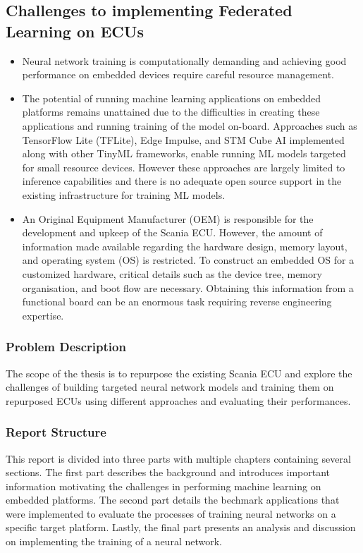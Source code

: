\subsection*{Challenges to implementing Federated Learning on ECUs}

\begin{itemize}
	\item Neural network training is computationally demanding and achieving good performance on embedded devices require careful resource management.
	\item The potential of running machine learning applications on embedded platforms remains unattained due to the difficulties in creating these applications and running training of the model on-board. Approaches such as TensorFlow Lite (TFLite), Edge Impulse, and STM Cube AI implemented along with other TinyML frameworks, enable running ML models targeted for small resource devices. However these approaches are largely limited to inference capabilities and there is no adequate open source support in the existing infrastructure for training ML models.
	\item An Original Equipment Manufacturer (OEM) is responsible for the development and upkeep of the Scania ECU. However, the amount of information made available regarding the hardware design, memory layout, and operating system (OS) is restricted. To construct an embedded OS for a customized hardware, critical details such as the device tree, memory organisation, and boot flow are necessary. Obtaining this information from a functional board can be an enormous task requiring reverse engineering expertise.
\end{itemize}

\subsubsection{Problem Description}

The scope of the thesis is to repurpose the existing Scania ECU and explore the challenges of building targeted neural network models and training them on repurposed ECUs using different approaches and evaluating their performances.

\subsubsection{Report Structure}

This report is divided into three parts with multiple chapters containing several sections. The first part describes the background and introduces important information motivating the challenges in performing machine learning on embedded platforms. The second part details the bechmark applications that were implemented to evaluate the processes of training neural networks on a specific target platform. Lastly, the final part presents an analysis and discussion on implementing the training of a neural network.

